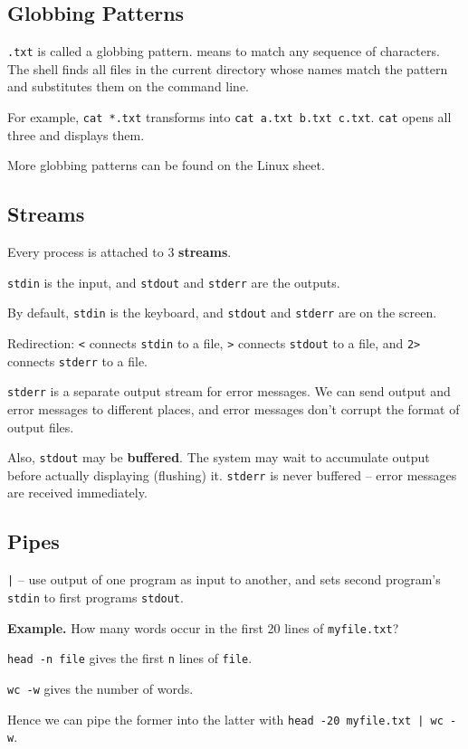 \documentclass[11pt]{article}
\theoremstyle{definition}
\begin{document}
\subsection{Globbing Patterns}
{\tt *.txt} is called a globbing pattern. {\tt *} means to match any sequence of characters. The shell finds all files in the current directory whose names match the pattern and substitutes them on the command line. 

For example, {\tt cat *.txt} transforms into {\tt cat a.txt b.txt c.txt}. {\tt cat} opens all three and displays them.

More globbing patterns can be found on the Linux sheet.

\subsection{Streams}
Every process is attached to 3 {\bf streams}.

{\tt stdin} is the input, and {\tt stdout} and {\tt stderr} are the outputs.

By default, {\tt stdin} is the keyboard, and {\tt stdout} and {\tt stderr} are on the screen.

Redirection: {\tt <} connects {\tt stdin} to a file, {\tt >} connects {\tt stdout} to a file, and {\tt 2>} connects {\tt stderr} to a file. 

{\tt stderr} is a separate output stream for error messages. We can send output and error messages to different places, and error messages don't corrupt the format of output files.

Also, {\tt stdout} may be {\bf buffered}. The system may wait to accumulate output before actually displaying (flushing) it. {\tt stderr} is never buffered -- error messages are received immediately.

\subsection{Pipes} 
{\tt |} -- use output of one program as input to another, and sets second program's {\tt stdin} to first programs {\tt stdout}.

{\bf Example.} How many words occur in the first 20 lines of {\tt myfile.txt}?

{\tt head -n file} gives the first {\tt n} lines of {\tt file}.

{\tt wc -w} gives the number of words.

Hence we can pipe the former into the latter with {\tt head -20 myfile.txt | wc -w}.
\end{document}
